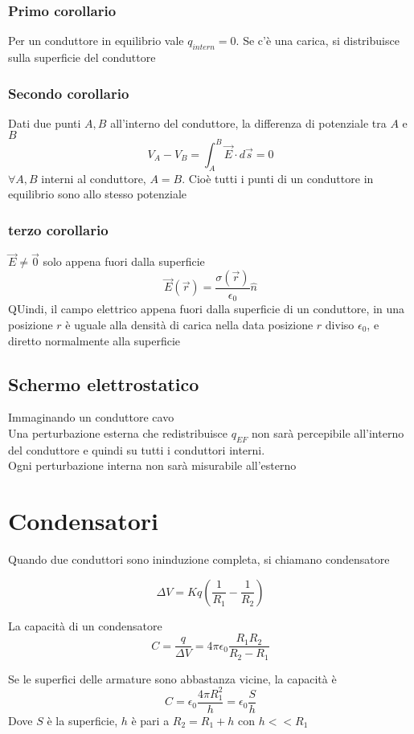 \documentclass[a4paper]{report}
\begin{document}
  \subsubsection{Primo corollario}
  Per un conduttore in equilibrio vale $q_{intern} =0$. Se c'è una carica, si distribuisce sulla superficie del conduttore
  \subsubsection{Secondo corollario}
  Dati due punti $A, B$ all'interno del conduttore, la differenza di potenziale tra $A$ e $B$
  \[V_A - V_B = \int_A^B \vec{E}\cdot d\vec{s}=0 \]
  $\forall A,B$ interni al conduttore, $A=B$. Cioè tutti i punti di un conduttore in equilibrio sono allo stesso potenziale
  \subsubsection{terzo corollario}
  \( \vec{E} \neq \vec{0} \) solo appena fuori dalla superficie
  \[ \vec{E}(\vec{r}) = \frac{\sigma(\vec{r})}{\epsilon_0} \hat{n} \]
  QUindi, il campo elettrico appena fuori dalla superficie di un conduttore, in una posizione $r$ è uguale alla densità di carica nella data posizione $r$ diviso $\epsilon_0$, e diretto normalmente alla superficie

  \subsection{Schermo elettrostatico}
  Immaginando un conduttore cavo\\
  Una perturbazione esterna che redistribuisce $q_{EF}$ non sarà percepibile all'interno del conduttore e quindi su tutti i conduttori interni.\\
  Ogni perturbazione interna non sarà misurabile all'esterno

  \section{Condensatori}
  Quando due conduttori sono ininduzione completa, si chiamano condensatore

  \[ \Delta V = Kq (\frac{1}{R_1} - \frac{1}{R_2}) \]

  La capacità di un condensatore
  \[ C= \frac{q}{\Delta V} = 4 \pi \epsilon_0 \frac{R_1 R_2}{R_2 - R_1} \]

  Se le superfici delle armature sono abbastanza vicine, la capacità è
  \[C = \epsilon_0 \frac{4 \pi R_1^2}{h} = \epsilon_0 \frac{S}{h}\]
  Dove $S$ è la superficie, $h$ è pari a $R_2 = R_1 + h$ con $h<<R_1$
\end{document}
